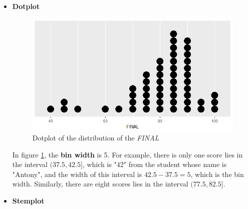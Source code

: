 \documentclass[a4paper, 12pt,twoside]{book}
\begin{document}
 \begin{itemize}

\item \textbf{Dotplot}\\
\begin{figure}[H]
\centering
\includegraphics[scale=0.3]{Dotplot.png}
\caption{Dotplot of the distribution of the \textit{FINAL}}
\label{dotplot}
\end{figure}

\noindent In figure \ref{dotplot}, the \textbf{bin width} is 5. For example, there is only one score lies in the interval $(37.5, 42.5]$, which is "42" from the student whose name is "Antony", and the width of this interval is $42.5-37.5 = 5$, which is the bin width. Similarly, there are eight scores lies in the interval $(77.5, 82.5]$. 
\vspace{0.6cm}

\item \textbf{Stemplot}\vspace{0.3cm}


\end{itemize}
\end{document}
